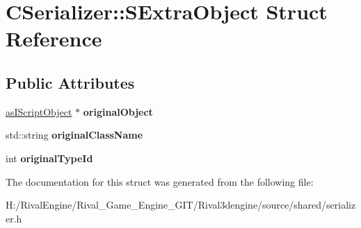 \hypertarget{struct_c_serializer_1_1_s_extra_object}{}\section{C\+Serializer\+:\+:S\+Extra\+Object Struct Reference}
\label{struct_c_serializer_1_1_s_extra_object}
\subsection*{Public Attributes}
\begin{DoxyCompactItemize}
\item 
\mbox{\label{struct_c_serializer_1_1_s_extra_object_a24a5e616df37ae585fcc9d0cea20fcde}} 
\hyperlink{classas_i_script_object}{as\+I\+Script\+Object} $\ast$ {\bfseries original\+Object}
\item 
\mbox{\label{struct_c_serializer_1_1_s_extra_object_a4c8a7873b57211fe48b771cb382ac6ad}} 
std\+::string {\bfseries original\+Class\+Name}
\item 
\mbox{\label{struct_c_serializer_1_1_s_extra_object_a19e3ab4219a023a90379509e3a6b2546}} 
int {\bfseries original\+Type\+Id}
\end{DoxyCompactItemize}


The documentation for this struct was generated from the following file\+:\begin{DoxyCompactItemize}
\item 
H\+:/\+Rival\+Engine/\+Rival\+\_\+\+Game\+\_\+\+Engine\+\_\+\+G\+I\+T/\+Rival3dengine/source/shared/serializer.\+h\end{DoxyCompactItemize}
